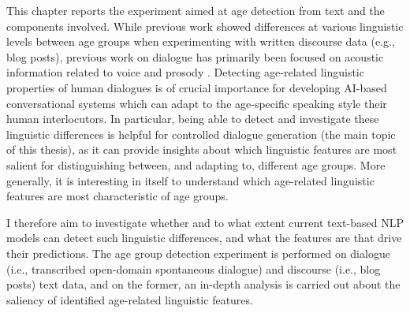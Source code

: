
This chapter reports the experiment aimed at age detection from text and the components involved. 
While previous work showed differences at various linguistic levels between age groups when experimenting with written discourse data (e.g., blog posts), previous work on dialogue has primarily been focused on acoustic information related to voice and prosody \citep{wolters2009age, li2013automatic}.
Detecting age-related linguistic properties of human dialogues is of crucial importance for developing AI-based conversational systems which can adapt to the age-specific speaking style their human interlocutors. In particular, being able to detect and investigate these linguistic differences is helpful for controlled dialogue generation (the main topic of this thesis), as it can provide insights about which linguistic features are most salient for distinguishing between, and adapting to, different age groups. More generally, it is interesting in itself to understand which age-related linguistic features are most characteristic of age groups. 

I therefore aim to investigate whether and to what extent current text-based NLP models can detect such linguistic differences, and what the features are that drive their predictions. The age group detection experiment is performed on dialogue (i.e., transcribed open-domain spontaneous dialogue) and discourse (i.e., blog posts) text data, and on the former, an in-depth analysis is carried out about the saliency of identified age-related linguistic features.


